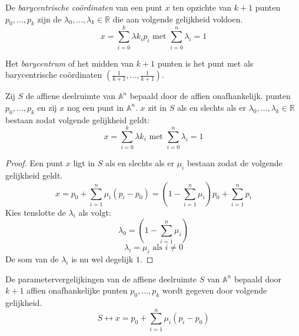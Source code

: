 \documentclass[main.tex]{subfiles}
\begin{document}
\begin{de}
  De \emph{barycentrische co\"ordinaten} van een punt $x$ ten opzichte van $k+1$ punten $p_{0},\dotsc,p_{k}$ zijn de $\lambda_{0},\dotsc,\lambda_{k} \in \mathbb{R}$ die aan volgende gelijkheid voldoen.
  \[ x = \sum_{i=0}^{k}\lambda k_{i}p_{i} \text{ met } \sum_{i=0}^{n}\lambda_{i} = 1 \]
\end{de}

\begin{de}
  Het \emph{barycentrum} of het midden van $k+1$ punten is het punt met als barycentrische co\"ordinaten $(\frac{1}{k+1},\dotsc,\frac{1}{k+1})$.
\end{de}


\begin{st}
  Zij $S$ de affiene deelruimte van $\mathbb{A}^{n}$ bepaald door de affien onafhankelijk. punten $p_{0},\dotsc,p_{k}$ en zij $x$ nog een punt in $\mathbb{A}^{n}$.
  $x$ zit in $S$ als en slechts als er $\lambda_{0},\dotsc,\lambda_{k} \in \mathbb{R}$ bestaan zodat volgende gelijkheid geldt:
  \[ x = \sum_{i=0}^{k}\lambda k_{i} \text{ met } \sum_{i=0}^{n}\lambda_{i} = 1\]

  \begin{proof}
    Een punt $x$ ligt in $S$ als en slechts als er $\mu_{i}$ bestaan zodat de volgende gelijkheid geldt.
    \[ x = p_{0} + \sum_{i=1}^{n}\mu_{i}(p_{i}-p_{0}) = \left(1 - \sum_{i=1}^{n}\mu_{i}\right)p_{0} + \sum_{i=1}^{n}p_{i} \]
    Kies tenslotte de $\lambda_{i}$ als volgt:
    \[ \lambda_{0} = \left(1 - \sum_{i=1}^{n}\mu_{i}\right) \]
    \[ \lambda_{i} = \mu_{i} \text{ als } i \neq 0 \]
    De som van de $\lambda_{i}$ is nu wel degelijk $1$.
  \end{proof}
\end{st}


\begin{de}
  De parametervergelijkingen van de affiene deelruimte $S$ van $\mathbb{A}^{n}$ bepaald door $k+1$ affien onafhankelijke punten $p_{0},\dotsc,p_{k}$ wordt gegeven door volgende gelijkheid.
  \[ S \leftrightarrow x = p_{0} + \sum_{i=1}^{n}\mu_{i}(p_{i}-p_{0}) \]
\end{de}
\end{document}
